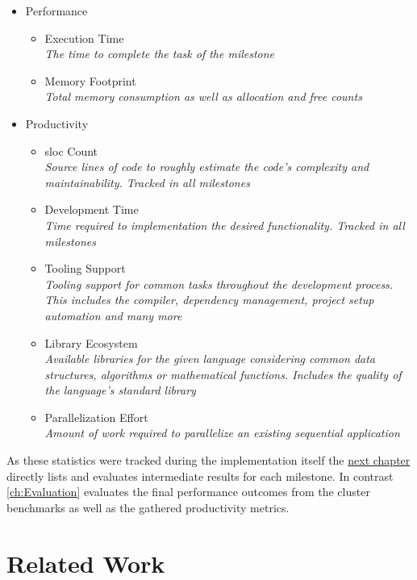 \begin{itemize}
    \item Performance
    \begin{itemize}
        \item Execution Time\\
        \textit{The time to complete the task of the milestone}
        \item Memory Footprint\\
        \textit{Total memory consumption as well as allocation and free counts}
    \end{itemize}
    \item Productivity
    \begin{itemize}
        \item \acrshort{sloc} Count\\
        \textit{Source lines of code to roughly estimate the code's complexity and maintainability. Tracked in all milestones}
        \item Development Time\\
        \textit{Time required to implementation the desired functionality. Tracked in all milestones}
        \item Tooling Support\\
        \textit{Tooling support for common tasks throughout the development process. This includes the compiler, dependency management, project setup automation and many more}
        \item Library Ecosystem\\
        \textit{Available libraries for the given language considering common data structures, algorithms or mathematical functions. Includes the quality of the language's standard library}
        \item Parallelization Effort\\
        \textit{Amount of work required to parallelize an existing sequential application}
    \end{itemize}
\end{itemize}

As these statistics were tracked during the implementation itself the \hyperref[ch:Implementation]{next chapter} directly lists and evaluates intermediate results for each milestone. In contrast \autoref{ch:Evaluation} evaluates the final performance outcomes from the cluster benchmarks as well as the gathered productivity metrics.

\section{Related Work}
\label{sec:Concept::Related}

